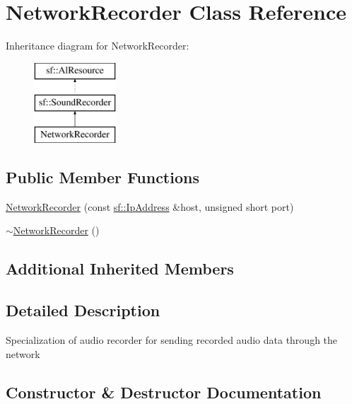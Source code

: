 \hypertarget{class_network_recorder}{}\section{Network\+Recorder Class Reference}
\label{class_network_recorder}
Inheritance diagram for Network\+Recorder\+:\begin{figure}[H]
\begin{center}
\leavevmode
\includegraphics[height=3.000000cm]{class_network_recorder}
\end{center}
\end{figure}
\subsection*{Public Member Functions}
\begin{DoxyCompactItemize}
\item 
\hyperlink{class_network_recorder_a30777f6c7a72b29e5230d9eb2033c92b}{Network\+Recorder} (const \hyperlink{classsf_1_1_ip_address}{sf\+::\+Ip\+Address} \&host, unsigned short port)
\item 
\hyperlink{class_network_recorder_a3df2a0d4bc3576cd8c745d34bf2cdfe2}{$\sim$\+Network\+Recorder} ()
\end{DoxyCompactItemize}
\subsection*{Additional Inherited Members}


\subsection{Detailed Description}
Specialization of audio recorder for sending recorded audio data through the network 

\subsection{Constructor \& Destructor Documentation}
\mbox{\label{class_network_recorder_a30777f6c7a72b29e5230d9eb2033c92b}} 
